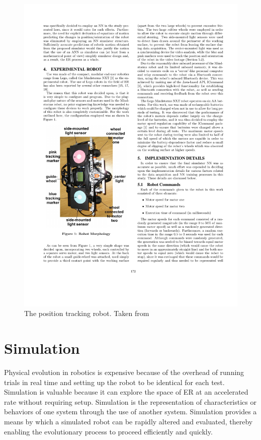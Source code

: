 \documentclass{sig-alternate}
\begin{document}
\begin{figure}%
\begin{center}
  \includegraphics[scale=.65]{cr1}
\end{center}
\caption{The position tracking robot. Taken from ~\cite{Pretorius:2009:TAN:1632149.1632171}}
\label{fig:pRobot}
\end{figure}
	
\section{Simulation}\label{simulation}
Physical evolution in robotics is expensive because of the overhead of running trials in real time and setting up the robot to be identical for each test. Simulation is valuable because it can explore the space of ER at an accelerated rate without requiring setup. Simulation is the representation of characteristics or behaviors of one system through the use of another system. Simulation provides a means by which a simulated robot can be rapidly altered and evaluated, thereby enabling the evolutionary process to proceed efficiently and quickly.
\end{document}
